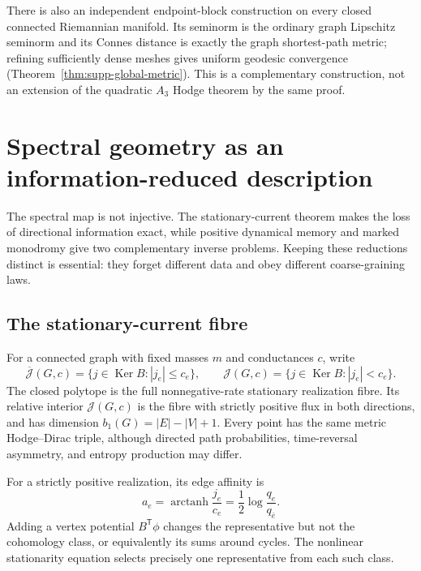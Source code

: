 \documentclass[11pt]{article}
\theoremstyle{definition}
\theoremstyle{remark}
\theoremstyle{definition}
\theoremstyle{remark}
\newcommand{\Ker}{\operatorname{Ker}}
\begin{document}
There is also an independent endpoint-block construction on every closed connected
Riemannian manifold.  Its seminorm is the ordinary graph Lipschitz seminorm and its
Connes distance is exactly the graph shortest-path metric; refining sufficiently
dense meshes gives uniform geodesic convergence
(Theorem~\ref{thm:supp-global-metric}).  This is a complementary construction,
not an extension of the quadratic $A_3$ Hodge theorem by the same proof.

\section{Spectral geometry as an information-reduced description}
\label{sec:universality-main}

The spectral map is not injective.  The stationary-current theorem makes the
loss of directional information exact, while positive dynamical memory and
marked monodromy give two complementary inverse problems.  Keeping these
reductions distinct is essential: they forget different data and obey different
coarse-graining laws.

\subsection{The stationary-current fibre}

For a connected graph with fixed masses $m$ and conductances $c$, write
\begin{equation}
 \overline{\mathcal J}(G,c)=\{j\in\Ker B:|j_e|\le c_e\},\qquad
 \mathcal J(G,c)=\{j\in\Ker B:|j_e|<c_e\}.
 \label{eq:summary-current-fibre}
\end{equation}
The closed polytope is the full nonnegative-rate stationary realization fibre.
Its relative interior $\mathcal J(G,c)$ is the fibre with strictly positive
flux in both directions, and has dimension $b_1(G)=|E|-|V|+1$.
Every point has the same metric Hodge--Dirac triple, although directed path
probabilities, time-reversal asymmetry, and entropy production may differ.

For a strictly positive realization, its edge affinity is
\begin{equation}
 a_e=\operatorname{arctanh}\frac{j_e}{c_e}
     =\frac12\log\frac{q_e}{q_{\bar e}}.
 \label{eq:summary-affinity}
\end{equation}
Adding a vertex potential $B^{\mathsf T}\phi$ changes the representative but
not the cohomology class, or equivalently its sums around cycles.  The
nonlinear stationarity equation selects precisely one representative from
each such class.
\end{document}
